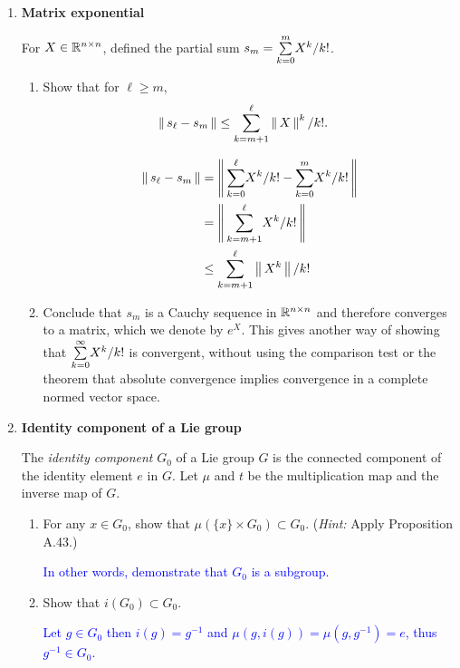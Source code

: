 \documentclass[12pt,a4paper]{report}
\newcommand{\BLUE}[1]{\textcolor{blue}{#1}}
\begin{document}
\begin{enumerate}[label=\textbf{15.\arabic*.}]

	\item \textbf{Matrix exponential}
	
	For $X \in \mathbb{R}^{n\times n}$, defined the partial sum $s_m=\underset{k=0}{\overset{m}{\sum}} X^k/k!$.
	
	\begin{enumerate}[label=(\alph*)]
	
		\item Show that for $\ell \ge m$,
		\begin{align*}
			\left \| \, s_\ell - s_m \,\right \| &\le \sum_{k=m+1}^{\ell} \left \| \, X \,\right \|^k/k!.
		\end{align*}

		\BLUE{\begin{align*}
			\left \| \, s_\ell - s_m \,\right \| &= \left \| \, \underset{k=0}{\overset{\ell}{\sum}} X^k/k! - \underset{k=0}{\overset{m}{\sum}} X^k/k! \,\right \| \\
			&= \left \| \, \underset{k=m+1}{\overset{\ell}{\sum}} X^k/k! \,\right \|\\
			&\le \underset{k=m+1}{\overset{\ell}{\sum}} \left \| \, X^k \,\right \|/k!
		\end{align*}
		}
		
		\item Conclude that $s_m$ is a Cauchy sequence in $\mathbb{R}^{n\times n}$ and therefore converges to a matrix, which we denote by $e^X$.  This gives another way of showing that $\underset{k=0}{\overset{\infty}{\sum}} X^k/k!$ is convergent, without using the comparison test or the theorem that absolute convergence implies convergence in a complete normed vector space.
	
	\end{enumerate}
	
	\item \textbf{Identity component of a Lie group}
	
	The \textit{identity component} $G_0$ of a Lie group $G$ is the connected component of the identity element $e$ in $G$.  Let $\mu$ and $t$ be the multiplication map and the inverse map of $G$.
	\begin{enumerate}[label=(\alph*)]
	
		\item For any $x\in G_0$, show that $\mu(\{x\}\times G_0) \subset G_0$.  (\textit{Hint: }Apply Proposition A.43.)
		
		\BLUE{In other words, demonstrate that $G_0$ is a subgroup.
		}
		
		\item Show that $i(G_0)\subset G_0$.
		
		\BLUE{Let $g \in G_0$ then $i(g)=g^{-1}$ and $\mu(g, i(g))=\mu(g,g^{-1})=e$, thus $g^{-1} \in G_0$.
		}
		

\end{enumerate}
\end{enumerate}
\end{document}
